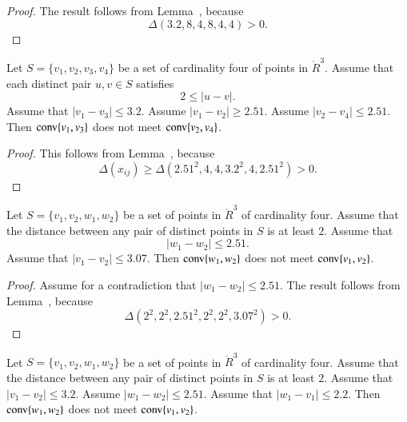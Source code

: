 
\begin{proof} The result follows from Lemma~,
because
  $$
  \Delta(3.2,8,4,8,4,4) > 0.
  $$
\end{proof}
\newpage


\begin{lemma}
Let $S=\{v_1,v_2,v_3,v_4\}$ be a
set of cardinality four of points in $\ring{R}^3$.
Assume that each distinct pair $u,v\in S$ satisfies
	$$2\le|u-v|.$$
  Assume that
	$|v_1-v_3|\le 3.2$.  Assume $|v_1-v_2|\ge 2.51$.
Assume $|v_2-v_4|\le 2.51$.
Then ${\operatorname{conv}}\{v_1,v_3\}$ does not meet
${\operatorname{conv}}\{v_2,v_4\}$.
\end{lemma}


\begin{proof}  This follows from Lemma~,
because    
   $$
    \Delta(x_{ij})\ge \Delta(2.51^2,4,4,3.2^2,4,2.51^2)>0.
    $$
\end{proof}
    
\newpage

\begin{lemma}
Let $S=\{v_1,v_2,w_1,w_2\}$ be a set of points
in $\ring{R}^3$ of cardinality four. Assume
that the distance between any pair of distinct
points in $S$ is at least $2$.  Assume that
	$$|w_1-w_2|\le 2.51.$$
Assume that $|v_1-v_2|\le 3.07$.  
Then
${\operatorname{conv}}\{w_1,w_2\}$ does not meet ${\operatorname{conv}}\{v_1,v_2\}$.
\end{lemma}


\begin{proof}
Assume for a contradiction that $|w_1-w_2|\le2.51$.
The result follows from  Lemma~,
because 
    $$
    \Delta(2^2,2^2,2.51^2,2^2,2^2,3.07^2) > 0.
    $$
\end{proof}

\newpage

\begin{lemma}
Let $S=\{v_1,v_2,w_1,w_2\}$ be a set of points
in $\ring{R}^3$ of cardinality four. Assume
that the distance between any pair of distinct
points in $S$ is at least $2$. 
Assume that $|v_1-v_2|\le 3.2$.  Assume $|w_1-w_2|\le 2.51$. 
Assume that
	$|w_1-v_1|\le 2.2$.
Then
${\operatorname{conv}}\{w_1,w_2\}$ does not meet ${\operatorname{conv}}\{v_1,v_2\}$.
\end{lemma}

